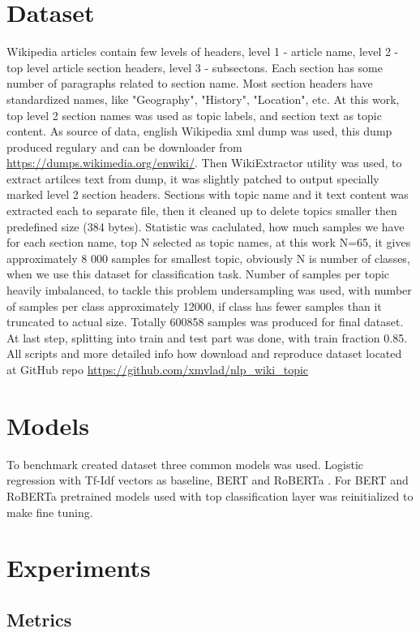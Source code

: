 \documentclass{article}
\begin{document}
\section{Dataset}
Wikipedia articles contain few levels of headers, level 1 - article name, level 2 - top level article section headers, level 3 - subsectons. Each section has some number of paragraphs related to section name. Most section headers have standardized names, like "Geography", "History", "Location", etc. 
At this work, top level 2 section names was used as topic labels, and section text as topic content. As source of data, english Wikipedia xml dump was used, this dump produced regulary and can be downloader from \url{https://dumps.wikimedia.org/enwiki/}. Then WikiExtractor utility was used, to extract artilces text from dump,
it was slightly patched to output specially marked level 2 section headers. Sections with topic name and it text content was extracted each to separate file, then it cleaned up to delete topics smaller then predefined size (384 bytes). Statistic was caclulated, how much samples we have for each section name,
top N selected as topic names, at this work N=65, it gives approximately 8 000 samples for smallest topic, obviously N is number of classes, when we use this dataset for classification task. Number of samples per topic heavily imbalanced, to tackle this problem undersampling was used, with number of samples per class approximately 12000,
if class has fewer samples than it truncated to actual size. Totally 600858 samples was produced for final dataset. At last step, splitting into train and test part was done, with train fraction 0.85. All scripts and more detailed info how download and reproduce dataset located at GitHub repo \url{https://github.com/xmvlad/nlp_wiki_topic}

\section{Models}
To benchmark created dataset three common models was used. Logistic regression with Tf-Idf vectors as baseline, BERT \cite{Devlin2018} and RoBERTa \cite{yinhan2019roberta}. For BERT and RoBERTa pretrained models used with top classification layer was reinitialized to make fine tuning.

\section{Experiments}

\subsection{Metrics}
\end{document}
